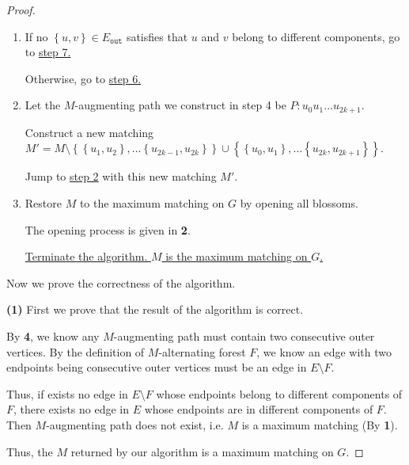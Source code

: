 \documentclass{article}
\newcommand{\set}[1]{\left\{#1\right\}}
\begin{document}
\begin{proof}
\begin{itemize}
\begin{enumerate}
            \item If no $\set{u,v}\in E_{\mathtt{out}}$ satisfies that $u$ and $v$ belong to different components, go to \underline{step 7.}
            
            Otherwise, go to \underline{step 6.}
            
            \item Let the $M$-augmenting path we construct in step 4 be $P:u_0u_1...u_{2k+1}$. 
            
            Construct a new matching $M'=M\setminus\set{\set{u_1,u_2},...\set{u_{2k-1},u_{2k}}}\cup\set{\set{u_0,u_1},...\set{u_{2k},u_{2k+1}}}$. 
            
            Jump to \underline{step 2} with this new matching $M'$.
            
            \item Restore $M$ to the maximum matching on $G$ by opening all blossoms. 
            
            The opening process is given in \textbf{2}.
            
            \underline{Terminate the algorithm. $M$ is the maximum matching on $G$.}
        \end{enumerate}
    \end{itemize}
    
    \vspace{1em} \hspace{1.3em}
    Now we prove the correctness of the algorithm.
    
    \vspace{1em} \hspace{1.3em}
    \textbf{(1)} First we prove that the result of the algorithm is correct.
    
    \hspace{1.3em}
    By \textbf{4}, we know any $M$-augmenting path must contain two consecutive outer vertices. By the definition of $M$-alternating forest $F$, we know an edge with two endpoints being consecutive outer vertices must be an edge in $E\setminus F$. 
    
    \hspace{1.3em}
    Thus, if exists no edge in $E\setminus F$ whose endpoints belong to different components of $F$, there exists no edge in $E$ whose endpoints are in different components of $F$. Then $M$-augmenting path does not exist, i.e. $M$ is a maximum matching (By \textbf{1}).
    
    \hspace{1.3em}
    Thus, the $M$ returned by our algorithm is a maximum matching on $G$.
    

\end{proof}
\end{document}
